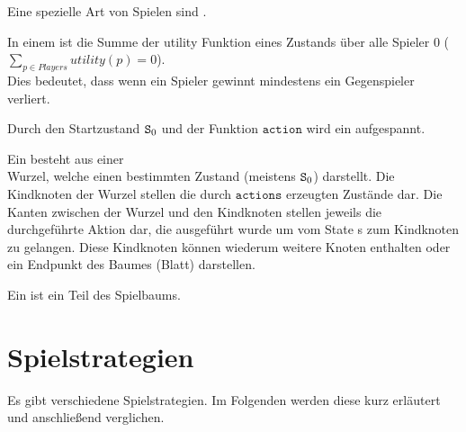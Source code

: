 Eine spezielle Art von Spielen sind .
\begin{Definition}
In einem  ist die Summe der utility Funktion eines Zustands über alle Spieler 0 ($\sum\limits_{p \in Players} utility(p) = 0$).
\\Dies bedeutet, dass wenn ein Spieler gewinnt mindestens ein Gegenspieler verliert.
\end{Definition}
Durch den Startzustand $\mathtt{S\textsubscript{0}}$ und der Funktion $\mathtt{action}$ wird ein  aufgespannt.
\begin{Definition}
Ein  besteht aus einer \\Wurzel, welche einen bestimmten Zustand (meistens $\mathtt{S\textsubscript{0}}$) darstellt. Die Kindknoten der Wurzel stellen die durch $\mathtt{actions}$ erzeugten Zustände dar. Die Kanten zwischen der Wurzel und den Kindknoten stellen jeweils die durchgeführte Aktion dar, die ausgeführt wurde um vom State s zum Kindknoten zu gelangen. Diese Kindknoten können wiederum weitere Knoten enthalten oder ein Endpunkt des Baumes (Blatt)  darstellen.
\end{Definition}
\begin{Definition}
Ein  ist ein Teil des Spielbaums.
\end{Definition}
\section{Spielstrategien}
Es gibt verschiedene Spielstrategien. Im Folgenden werden diese kurz erläutert und anschließend verglichen.
